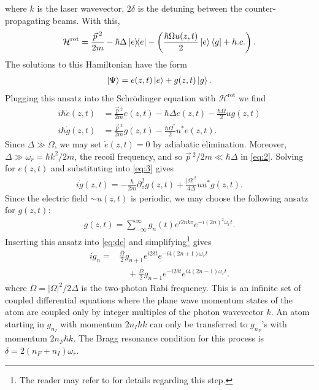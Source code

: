 \documentclass[reprint,
nofootinbib,
amsmath,amssymb,
aps]{revtex4-1}
\newcommand{\p}{\partial}
\newcommand{\f}[2]{\frac{#1}{#2}}
\newcommand{\lp}{\left(}
\newcommand{\rp}{\right)}
\begin{document}
where $k$ is the laser wavevector, $2\delta$ is the detuning between the counter-propagating beams. With this, 
\begin{align*}
\mathcal{H}^\text{rot} = \f{\vec{p}\,^2}{2m} -\hbar \Delta  \ketbra{e} -\lp \f{\hbar\Omega u(z,t)}{2}\ket{e}\bra{g} + h.c.\rp.
\end{align*}
The solutions to this Hamiltonian have the form 
\begin{align*}
\ket{\Psi} = e(z,t)\ket{e} + g(z,t)\ket{g}.
\end{align*} 
Plugging this ansatz into the Schr\"{o}dinger equation with $\mathcal{H}^\text{rot}$ we find 
\begin{align}
i\hbar \dot{e}(z,t) &= \f{\vec{p}\,^2}{2m} e(z,t) - \hbar \Delta e(z,t) - \f{\hbar\Omega}{2}ug(z,t)\label{eq:2}\\
i\hbar \dot{g}(z,t) &= \f{\vec{p}\,^2}{2m} g(z,t) - \f{\hbar\Omega^*}{2}u^*e(z,t)\label{eq:3}.
\end{align}
Since $\Delta \gg \Omega$, we may set $\dot{e}(z,t) = 0$ by adiabatic elimination. Moreover, $\Delta \gg \omega_r = \hbar k^2/2m$, the recoil frequency, and so $\vec{p}\,^2/2m\ll \hbar \Delta$ in \eqref{eq:2}. Solving for $e(z,t)$ and substituting into \eqref{eq:3} gives
\begin{align}\label{eq:de}
i\dot{g}(z,t) = -\f{\hbar}{2m}\p_z^2 g(z,t) + \f{|\Omega|^2}{4\Delta} uu^* g(z,t).
\end{align}
Since the electric field $\sim u(z,t)$ is periodic, we may choose the following ansatz for $g(z,t)$:
\begin{align}\label{eq:ansatz}
g(z,t) = \sum_{-\infty}^\infty g_n(t) e^{i2nkz} e^{-i(2n)^2 \omega_r t}.
\end{align}
Inserting this ansatz into \eqref{eq:de} and simplifying\footnote{The reader may refer to \cite{estey2016precision} for details regarding this step.} gives
\begin{align}\label{eq:soln}
i\dot{g}_n = &\f{\bar{\Omega}}{2} g_{n+1} e^{i2\delta t} e^{-i 4(2n+1) \omega_r t} \nonumber\\
&\quad+ \f{\bar{\Omega}}{2}g_{n-1} e^{-i2\delta t} e^{i4(2n-1)\omega_r t}.
\end{align}
where $\bar{\Omega} = |\Omega|^2/2\Delta$ is the two-photon Rabi frequency. This is an infinite set of coupled differential equations where the plane wave momentum states of the atom are coupled only by integer multiples of the photon wavevector $k$. An atom starting in $g_{n_I}$ with momentum $2n_I \hbar k$ can only be transferred to $g_{n_F}$'s with momentum $2n_F \hbar k$. The Bragg resonance condition for this process is $\delta = 2(n_F + n_I)\omega_r$. 
\end{document}
